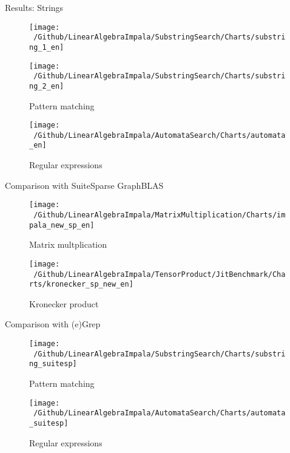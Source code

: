 \documentclass{beamer}
\begin{document}
\begin{frame}{Results: Strings}
\begin{figure}
	\begin{minipage}{.5\textwidth}
		\centering
		\begin{minipage}{.5\textwidth}
			\centering
			\texttt{[image: ~/Github/LinearAlgebraImpala/SubstringSearch/Charts/substring\_1\_en]}
		\end{minipage}\hfill
		\begin{minipage}{.5\textwidth}
			\centering
			\texttt{[image: ~/Github/LinearAlgebraImpala/SubstringSearch/Charts/substring\_2\_en]}
		\end{minipage}
		\caption*{\small Pattern matching}
	\end{minipage}\hfill
	\begin{minipage}{.5\textwidth}
		\centering
		\texttt{[image: ~/Github/LinearAlgebraImpala/AutomataSearch/Charts/automata\_en]}
		\caption*{\small Regular expressions}
	\end{minipage}
\end{figure}
\end{frame}


\begin{frame}{Comparison with SuiteSparse GraphBLAS}
	\begin{figure}
		\begin{minipage}{.5\textwidth}
			\texttt{[image: ~/Github/LinearAlgebraImpala/MatrixMultiplication/Charts/impala\_new\_sp\_en]}
			\caption*{\small Matrix multplication}
		\end{minipage}\hfill
		\begin{minipage}{.5\textwidth}
			
			\texttt{[image: ~/Github/LinearAlgebraImpala/TensorProduct/JitBenchmark/Charts/kronecker\_sp\_new\_en]}
			\caption*{\small Kronecker product}
		\end{minipage}
	\end{figure}
\end{frame}

\begin{frame}{Comparison with (e)Grep}
	\begin{figure}
		\begin{minipage}{.5\textwidth}
			\centering
			\begin{minipage}{1.0\textwidth}
				\centering
				
				\texttt{[image: ~/Github/LinearAlgebraImpala/SubstringSearch/Charts/substring\_suitesp]}
			\end{minipage}\hfill
			
			\caption*{\small Pattern matching}
		\end{minipage}\hfill
		\begin{minipage}{.5\textwidth}
			\centering
			\texttt{[image: ~/Github/LinearAlgebraImpala/AutomataSearch/Charts/automata\_suitesp]}
			\caption*{\small Regular expressions}
		\end{minipage}
	\end{figure}
\end{frame}
\end{document}
